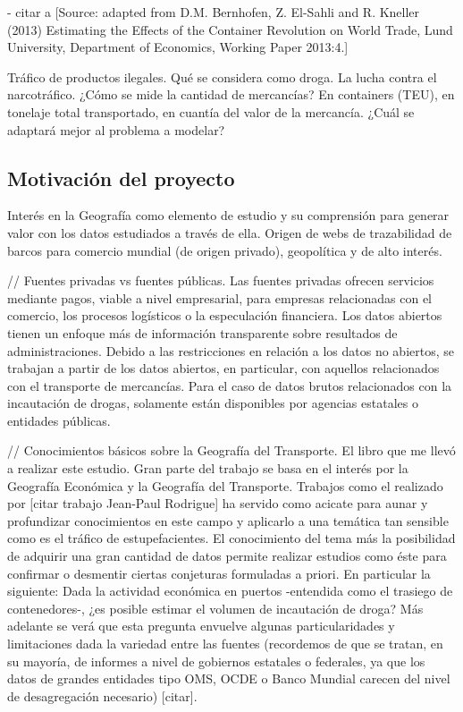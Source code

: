 \documentclass{article}
\begin{document}
- citar a [Source: adapted from D.M. Bernhofen, Z. El-Sahli and R. Kneller (2013) Estimating the Effects of the Container Revolution on World Trade, Lund University, Department of Economics, Working Paper 2013:4.]

Tráfico de productos ilegales. Qué se considera como droga. La lucha contra el narcotráfico.
¿Cómo se mide la cantidad de mercancías? En containers (TEU), en tonelaje total transportado, en
cuantía del valor de la mercancía. ¿Cuál se adaptará mejor al problema a modelar?

\subsection{Motivación del proyecto}
Interés en la Geografía como elemento de estudio y su comprensión para generar valor con los datos estudiados a través de ella.
Origen de webs de trazabilidad de barcos para comercio mundial (de origen privado), geopolítica y de alto interés.

// Fuentes privadas vs fuentes públicas. Las fuentes privadas ofrecen servicios mediante pagos, viable a nivel empresarial, para empresas relacionadas con el comercio, los procesos logísticos o la especulación financiera. Los datos abiertos tienen un enfoque más de información transparente sobre resultados de administraciones. Debido a las restricciones en relación a los datos no abiertos, se trabajan a partir de los datos abiertos, en particular, con aquellos relacionados con el transporte de mercancías. Para el caso de datos brutos relacionados con la incautación de drogas, solamente están disponibles por agencias estatales o entidades públicas.

// Conocimientos básicos sobre la Geografía del Transporte. El libro que me llevó a realizar este estudio.
Gran parte del trabajo se basa en el interés por la Geografía Económica y la Geografía del Transporte. Trabajos como el realizado por [citar trabajo Jean-Paul Rodrigue] ha servido como acicate para aunar y profundizar conocimientos en este campo y aplicarlo a una temática tan sensible como es el tráfico de estupefacientes. El conocimiento del tema más la posibilidad de adquirir una gran cantidad de datos permite realizar estudios como éste para confirmar o desmentir ciertas conjeturas formuladas a priori. En particular la siguiente: Dada la actividad económica en puertos -entendida como el trasiego de contenedores-, ¿es posible estimar el volumen de incautación de droga? Más adelante se verá que esta pregunta envuelve algunas particularidades y limitaciones dada la variedad entre las fuentes (recordemos de que se tratan, en su mayoría, de informes a nivel de gobiernos estatales o federales, ya que los datos de grandes entidades tipo OMS, OCDE o Banco Mundial carecen del nivel de desagregación necesario) [citar].
\end{document}
